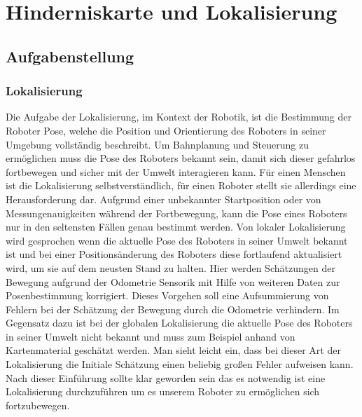 \chapter{Hinderniskarte und Lokalisierung}
\label{lokalisierung_cha}
\section{Aufgabenstellung}
\label{lokalisierung_aufgabenstellung_sec}
\authorsection{\editorandreas}
\subsection{Lokalisierung}
Die Aufgabe der Lokalisierung, im Kontext der Robotik, ist die Bestimmung der
Roboter Pose, welche die Position und Orientierung des Roboters in seiner Umgebung vollständig beschreibt.
 Um Bahnplanung und Steuerung zu ermöglichen muss die Pose des Roboters bekannt sein,
 damit sich dieser gefahrlos fortbewegen und sicher mit der Umwelt interagieren kann.
 Für einen Menschen ist die Lokalisierung selbstverständlich, für einen Roboter
 stellt sie allerdings eine Herausforderung dar.
 Aufgrund einer unbekannter Startposition oder von Messungenauigkeiten während
 der Fortbewegung, kann die Pose eines Roboters nur in den seltensten Fällen
 genau bestimmt werden.
 Von lokaler Lokalisierung wird gesprochen wenn die aktuelle Pose des Roboters
 in seiner Umwelt bekannt ist und bei einer Positionsänderung des Roboters diese
 fortlaufend aktualisiert wird, um sie auf dem neusten Stand zu halten. Hier
 werden Schätzungen der Bewegung aufgrund der Odometrie Sensorik mit Hilfe von weiteren Daten zur Posenbestimmung korrigiert. Dieses Vorgehen soll eine Aufsummierung von Fehlern bei der
 Schätzung der Bewegung durch die Odometrie verhindern. Im Gegensatz dazu ist
 bei der globalen Lokalisierung die aktuelle Pose des Roboters in seiner Umwelt
 nicht bekannt und muss zum Beispiel anhand von Kartenmaterial geschätzt werden.
 Man sieht leicht ein, dass bei dieser Art der Lokalisierung die Initiale Schätzung einen beliebig großen Fehler aufweisen kann.
 Nach dieser Einführung sollte klar geworden sein das es notwendig ist eine Lokalisierung durchzuführen um es unserem Roboter zu ermöglichen sich fortzubewegen.
